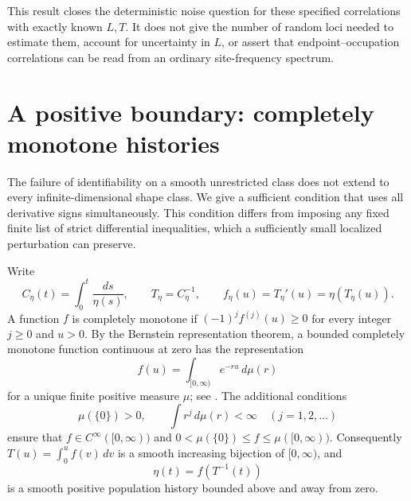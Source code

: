 \documentclass[11pt]{article}
\theoremstyle{definition}
\theoremstyle{remark}
\numberwithin{equation}{section}
\begin{document}
This result closes the deterministic noise question for these specified
correlations with exactly known $L,T$.  It does not give the number of
random loci needed to estimate them, account for uncertainty in $L$,
or assert that endpoint--occupation correlations can be read from an
ordinary site-frequency spectrum.


\section{A positive boundary: completely monotone histories}
\label{sec:complete-monotonicity}

The failure of identifiability on a smooth unrestricted class does not
extend to every infinite-dimensional shape class.  We give a sufficient
condition that uses all derivative signs simultaneously.  This condition
differs from imposing any fixed finite list of strict differential
inequalities, which a sufficiently small localized perturbation can preserve.

Write
\[
 C_\eta(t)=\int_0^t\frac{ds}{\eta(s)},\qquad
 T_\eta=C_\eta^{-1},\qquad
 f_\eta(u)=T_\eta'(u)=\eta(T_\eta(u)).
\]
A function $f$ is completely monotone if
$(-1)^j f^{(j)}(u)\geq0$ for every integer $j\geq0$ and $u>0$.
By the Bernstein representation theorem, a bounded completely monotone
function continuous at zero has the representation
\begin{equation}\label{eq:cm-bernstein}
 f(u)=\int_{[0,\infty)} e^{-ru}\,d\mu(r)
\end{equation}
for a unique finite positive measure $\mu$; see
\cite[Chapter~1]{SSV2012}.  The additional conditions
\begin{equation}\label{eq:cm-measure-class}
 \mu(\{0\})>0,\qquad
 \int r^j\,d\mu(r)<\infty\quad(j=1,2,\ldots)
\end{equation}
ensure that $f\in C^\infty([0,\infty))$ and
$0<\mu(\{0\})\leq f\leq\mu([0,\infty))$.
Consequently $T(u)=\int_0^u f(v)\,dv$ is a smooth increasing bijection
of $[0,\infty)$, and
\begin{equation}\label{eq:cm-history-reconstruction}
 \eta(t)=f(T^{-1}(t))
\end{equation}
is a smooth positive population history bounded above and away from zero.
\end{document}
